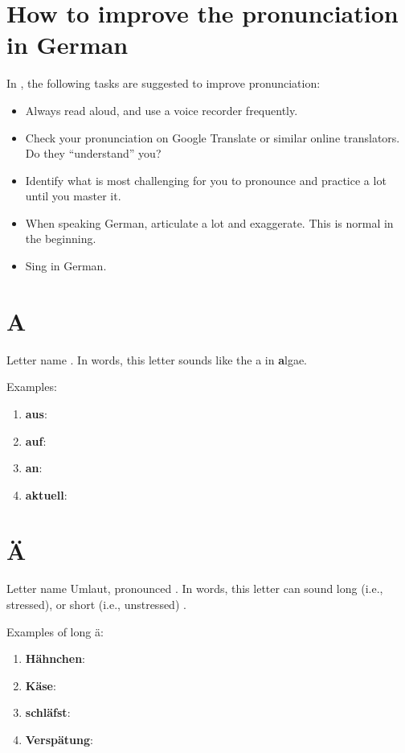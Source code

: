 \section*{How to improve the pronunciation in German}

In \cite{raville2025}, the following tasks are suggested to improve pronunciation:
\begin{itemize}
    \item Always read aloud, and use a voice recorder frequently.
    \item Check your pronunciation on Google Translate or similar online translators. Do they ``understand'' you?
    \item Identify what is most challenging for you to pronounce and practice a lot until you master it.
    \item When speaking German, articulate a lot and exaggerate. This is normal in the beginning.
    \item Sing in German.
\end{itemize}


\section*{A}

Letter name \textipa{[a]}. In words, this letter sounds like the a in \textbf{a}lgae.

Examples:
\begin{enumerate}
    \item \textbf{aus}: \textipa{[aUs]}
    \item \textbf{auf}: \textipa{[aUf]}
    \item \textbf{an}: \textipa{[an]}
    \item \textbf{aktuell}: \textipa{[aktu"El]}
\end{enumerate}

\section*{Ä}

Letter name \textipa{[a]} Umlaut, pronounced \textipa{[E:]}. In words, this letter can sound long (i.e., stressed), or short (i.e., unstressed) \cite{umlaute2021}.

Examples of long ä:
\begin{enumerate}    
    \item \textbf{Hähnchen}: \textipa{["hE:n\c{c}@n]}
    \item \textbf{Käse}: \textipa{["kE:z@]}
    \item \textbf{schläfst}: 
    \item \textbf{Verspätung}: 
\end{enumerate}

